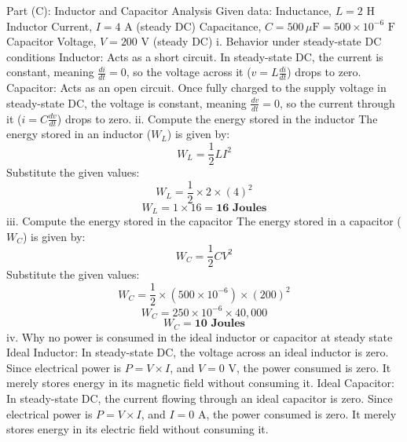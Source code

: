Part (C): Inductor and Capacitor Analysis
Given data:
Inductance, $L = 2\text{ H}$
Inductor Current, $I = 4\text{ A}$ (steady DC)
Capacitance, $C = 500\,\mu\text{F} = 500 \times 10^{-6}\text{ F}$
Capacitor Voltage, $V = 200\text{ V}$ (steady DC)
i. Behavior under steady-state DC conditions
Inductor: Acts as a short circuit. In steady-state DC, the current is constant, meaning $\frac{di}{dt} = 0$, so the voltage across it ($v = L\frac{di}{dt}$) drops to zero.
Capacitor: Acts as an open circuit. Once fully charged to the supply voltage in steady-state DC, the voltage is constant, meaning $\frac{dv}{dt} = 0$, so the current through it ($i = C\frac{dv}{dt}$) drops to zero.
ii. Compute the energy stored in the inductor
The energy stored in an inductor ($W_L$) is given by:
$$W_L = \frac{1}{2} L I^2$$ 
Substitute the given values:
$$W_L = \frac{1}{2} \times 2 \times (4)^2$$ 
$$W_L = 1 \times 16 = \mathbf{16\text{ Joules}}$$ 
iii. Compute the energy stored in the capacitor
The energy stored in a capacitor ($W_C$) is given by:
$$W_C = \frac{1}{2} C V^2$$ 
Substitute the given values:
$$W_C = \frac{1}{2} \times (500 \times 10^{-6}) \times (200)^2$$ 
$$W_C = 250 \times 10^{-6} \times 40,000$$ 
$$W_C = \mathbf{10\text{ Joules}}$$ 
iv. Why no power is consumed in the ideal inductor or capacitor at steady state
Ideal Inductor: In steady-state DC, the voltage across an ideal inductor is zero. Since electrical power is $P = V \times I$, and $V = 0\text{ V}$, the power consumed is zero. It merely stores energy in its magnetic field without consuming it.
Ideal Capacitor: In steady-state DC, the current flowing through an ideal capacitor is zero. Since electrical power is $P = V \times I$, and $I = 0\text{ A}$, the power consumed is zero. It merely stores energy in its electric field without consuming it.
